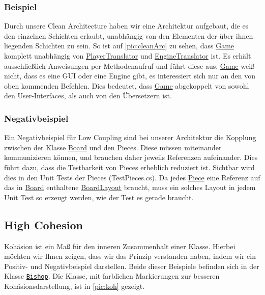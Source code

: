 \documentclass[
10pt, %
a4paper, %
oneside, %
headinclude,footinclude, %
BCOR5mm, %
]{scrartcl}
\begin{document}
\begin{onehalfspace}
\subsubsection{Beispiel}
Durch unsere Clean Architecture haben wir eine Architektur aufgebaut, die es den einzelnen Schichten erlaubt, unabhängig von den Elementen der über ihnen liegenden Schichten zu sein. So ist auf \autoref{pic:cleanArc} zu sehen, dass \href{https://github.com/schmida736/Chess-AdvancedSE/blob/main/Chess-AdvancedSE/Game\%20Elements/Game.cs}{Game} komplett unabhängig von \href{https://github.com/schmida736/Chess-AdvancedSE/blob/main/Chess-AdvancedSE/Translators/PlayerTranslator.cs}{PlayerTranslator} und \href{https://github.com/schmida736/Chess-AdvancedSE/blob/main/Chess-AdvancedSE/Translators/EngineTranslator.cs}{EngineTranslator} ist. Es erhält ausschließlich Anweisungen per Methodenaufruf und führt diese aus. \href{https://github.com/schmida736/Chess-AdvancedSE/blob/main/Chess-AdvancedSE/Game\%20Elements/Game.cs}{Game} weiß nicht, dass es eine GUI oder eine Engine gibt, es interessiert sich nur an den von oben kommenden Befehlen. Dies bedeutet, dass \href{https://github.com/schmida736/Chess-AdvancedSE/blob/main/Chess-AdvancedSE/Game\%20Elements/Game.cs}{Game} abgekoppelt von sowohl den User-Interfaces, als auch von den Übersetzern ist.

\subsubsection{Negativbeispiel}
Ein Negativbeispiel für Low Coupling sind bei unserer Architektur die Kopplung zwischen der Klasse \href{https://github.com/schmida736/Chess-AdvancedSE/blob/main/Chess-AdvancedSE/Game\%20Elements/Board.cs}{Board} und den Pieces. Diese müssen miteinander kommunizieren können, und brauchen daher jeweils Referenzen aufeinander. Dies führt dazu, dass die Testbarkeit von Pieces erheblich reduziert ist. Sichtbar wird dies in den Unit Tests der Pieces (TestPieces.cs). Da jedes \href{https://github.com/schmida736/Chess-AdvancedSE/blob/main/Chess-AdvancedSE/Game\%20Elements/Pieces/Piece.cs}{Piece} eine Referenz auf das in \href{https://github.com/schmida736/Chess-AdvancedSE/blob/main/Chess-AdvancedSE/Game\%20Elements/Board.cs}{Board} enthaltene \href{https://github.com/schmida736/Chess-AdvancedSE/blob/main/Chess-AdvancedSE/Game\%20Elements/BoardLayout.cs}{BoardLayout} braucht, muss ein solches Layout in jedem Unit Test so erzeugt werden, wie der Test es gerade braucht.

\subsection{High Cohesion}
Kohäsion ist ein Maß für den inneren Zusammenhalt einer Klasse. Hierbei möchten wir Ihnen zeigen, dass wir das Prinzip verstanden haben, indem wir ein Positiv- und Negativbeispiel darstellen. Beide dieser Beispiele befinden sich in der Klasse \texttt{\href{https://github.com/schmida736/Chess-AdvancedSE/blob/main/Chess-AdvancedSE/Game\%20Elements/Pieces/Bishop.cs}{Bishop}}. Die Klasse, mit farblichen Markierungen zur besseren Kohäsionsdarstellung, ist in \autoref{pic:koh} gezeigt.


\end{onehalfspace}
\end{document}
